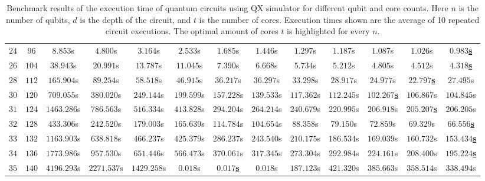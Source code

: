 \begin{table}[ht]
\begin{adjustwidth}{-1.6cm}{-1.6cm}
{\begin{tabular}{ccccccccccccc}
            $24$ & $96$ & $8.853$s & $4.800$s & $3.164$s & $2.533$s & $1.685$s & $1.446$s & $1.297$s & $1.187$s & $1.087$s & $1.026$s & \underline{$\mathbf{0.983}$\textbf{s}} \\
            $26$ & $104$ & $38.943$s & $20.991$s & $13.787$s & $11.045$s & $7.390$s & $6.668$s & $5.734$s & $5.212$s & $4.805$s & $4.512$s & \underline{$\mathbf{4.318}$\textbf{s}} \\
            $28$ & $112$ & $165.904$s & $89.254$s & $58.518$s & $46.915$s & $36.217$s & $36.297$s & $33.298$s & $28.917$s & $24.977$s & \underline{$\mathbf{22.797}$\textbf{s}} & $27.495$s \\
            $30$ & $120$ & $709.055$s & $380.020$s & $249.144$s & $199.599$s & $157.228$s & $139.533$s & $117.362$s & $112.245$s & \underline{$\mathbf{102.267}$\textbf{s}} & $106.867$s & $104.845$s \\
            $31$ & $124$ & $1463.286$s & $786.563$s & $516.334$s & $413.828$s & $294.204$s & $264.214$s & $240.679$s & $220.995$s & $206.918$s & \underline{$\mathbf{205.207}$\textbf{s}} & $206.205$s \\
            $32$ & $128$ & $433.306$s & $242.520$s & $179.003$s & $165.639$s & $114.784$s & $104.654$s & $88.358$s & $79.150$s & $72.859$s & $69.329$s & \underline{$\mathbf{66.556}$\textbf{s}} \\
            $33$ & $132$ & $1163.903$s & $638.818$s & $466.237$s & $425.379$s & $286.237$s & $243.540$s & $210.175$s & $186.534$s & $169.039$s & $160.732$s & \underline{$\mathbf{153.434}$\textbf{s}} \\
            $34$ & $136$ & $1773.986$s & $957.530$s & $651.446$s & $566.473$s & $370.061$s & $317.345$s & $273.304$s & $292.984$s & $224.161$s & $208.400$s & \underline{$\mathbf{195.224}$\textbf{s}} \\
            $35$ & $140$ & $4196.293$s & $2271.537$s & $1429.258$s & $0.018$s & \underline{$\mathbf{0.017}$\textbf{s}} & $0.018$s & $187.123$s & $421.320$s & $385.663$s & $358.514$s & $338.494$s \\
            
        \end{tabular}
    }
    \end{adjustwidth}
    \caption[Benchmark results of the execution time of quantum circuits using QX simulator for different qubit and core counts.]{
        Benchmark results of the execution time of quantum circuits using QX simulator for different qubit and core counts.
        Here $n$ is the number of qubits, $d$ is the depth of the circuit, and $t$ is the number of cores.
        Execution times shown are the average of 10 repeated circuit executions.
        The optimal amount of cores $t$ is highlighted for every $n$.
    }
    \label{table:qx_benchmark}
\end{table}

